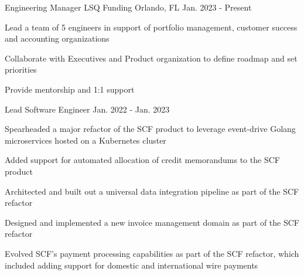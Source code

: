 

\begin{cventries}

\cventry
   {Engineering Manager} %
   {LSQ Funding} %
   {Orlando, FL} %
   {Jan. 2023 - Present} %
   {
      \begin{cvitems} %
        \item{Lead a team of 5 engineers in support of portfolio management, customer success and accounting organizations}
        \item{Collaborate with Executives and Product organization to define roadmap and set priorities}
        \item{Provide mentorship and 1:1 support}
      \end{cvitems}
   }
   
   \cventry
   {Lead Software Engineer} %
   {} %
   {} %
   {Jan. 2022 - Jan. 2023} %
   {
      \begin{cvitems} %
        \item{Spearheaded a major refactor of the SCF product to leverage event-drive Golang microservices hosted on a Kubernetes cluster}
        \item{Added support for automated allocation of credit memorandums to the SCF product}
        \item{Architected and built out a universal data integration pipeline as part of the SCF refactor}
        \item{Designed and implemented a new invoice management domain as part of the SCF refactor}
        \item{Evolved SCF's payment processing capabilities as part of the SCF refactor, which included adding support for domestic and international wire payments}
      \end{cvitems}
   }
   

\end{cventries}
